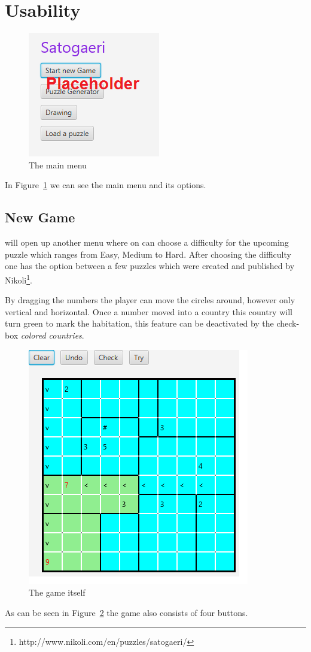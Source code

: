 \section{Usability}
\begin{figure}
  \centering
  \includegraphics[scale=1]{Pictures/main_menu.png} 
  \caption{The main menu}
  \label{fig:main_menu}
\end{figure}
In Figure~\ref{fig:main_menu} we can see the main menu and its options.

\subsection{New Game} will open up another menu where on can choose a difficulty for the upcoming puzzle which ranges from Easy, Medium to Hard. After choosing the difficulty one has the option between a few puzzles which were created and published by Nikoli\footnote{http://www.nikoli.com/en/puzzles/satogaeri/}.

By dragging the numbers the player can move the circles around, however only vertical and horizontal. Once a number moved into a country this country will turn green to mark the habitation, this feature can be deactivated by the check-box \emph{colored countries}.
\begin{figure}
  \centering
  \includegraphics[scale=1]{Pictures/game.png} 
  \caption{The game itself}
  \label{fig:game}
\end{figure}
As can be seen in Figure~\ref{fig:game} the game also consists of four buttons.

